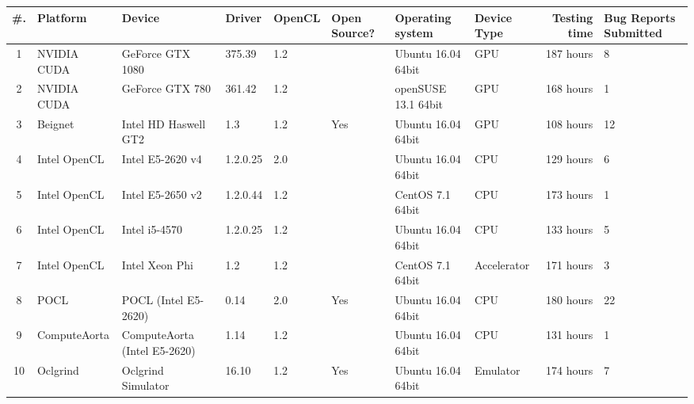 \begin{tabular}{ cllllL{1cm}ll | rR{1.4cm} }
\toprule
\textbf{\#. } & \textbf{Platform} & \textbf{Device} & \textbf{Driver} & \textbf{OpenCL} & \textbf{Open Source?} & 
\textbf{Operating system} & \textbf{Device Type} & \textbf{Testing time} & \textbf{Bug Reports Submitted} \\
 & NVIDIA CUDA & GeForce GTX 1080 & 375.39 & 1.2 &  & Ubuntu 16.04 64bit & GPU & 187 hours & 8 \\
2 & NVIDIA CUDA & GeForce GTX 780 & 361.42 & 1.2 &  & openSUSE  13.1 64bit & GPU & 168 hours & 1 \\
3 & Beignet & Intel HD Haswell GT2 & 1.3 & 1.2 & Yes & Ubuntu 16.04 64bit & GPU & 108 hours & 12 \\
4 & Intel OpenCL & Intel E5-2620 v4 & 1.2.0.25 & 2.0 &  & Ubuntu 16.04 64bit & CPU & 129 hours & 6 \\
5 & Intel OpenCL & Intel E5-2650 v2 & 1.2.0.44 & 1.2 &  & CentOS 7.1 64bit & CPU & 173 hours & 1 \\
6 & Intel OpenCL & Intel i5-4570 & 1.2.0.25 & 1.2 &  & Ubuntu 16.04 64bit & CPU & 133 hours & 5 \\
7 & Intel OpenCL & Intel Xeon Phi & 1.2 & 1.2 &  & CentOS 7.1 64bit & Accelerator & 171 hours & 3 \\
8 & POCL & POCL (Intel E5-2620) & 0.14 & 2.0 & Yes & Ubuntu 16.04 64bit & CPU & 180 hours & 22 \\
9 & ComputeAorta & ComputeAorta (Intel E5-2620) & 1.14 & 1.2 &  & Ubuntu 16.04 64bit & CPU & 131 hours & 1 \\
10 & Oclgrind & Oclgrind Simulator & 16.10 & 1.2 & Yes & Ubuntu 16.04 64bit & Emulator & 174 hours & 7 \\

\bottomrule
\end{tabular}

